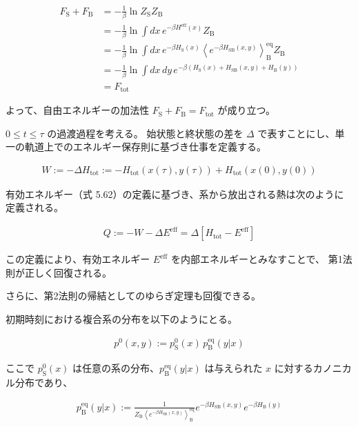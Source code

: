 \documentclass[a4paper,11pt]{jsarticle}
\numberwithin{equation}{section}
\begin{document}
\begin{align}
F_{\text{S}} + F_{\text{B}} &= -\frac{1}{\beta} \ln Z_{\text{S}} Z_{\text{B}} \\
&= -\frac{1}{\beta} \ln \int dx\, e^{-\beta H^{\mathrm{eff}}(x)} Z_{\text{B}} \\
&= -\frac{1}{\beta} \ln \int dx\, e^{-\beta H_{\text{S}}(x)} \left\langle e^{-\beta H_{\text{SB}}(x,y)} \right\rangle_{\text{B}}^{\mathrm{eq}} Z_{\text{B}} \\
&= -\frac{1}{\beta} \ln \int dx\, dy\, e^{-\beta (H_{\text{S}}(x) + H_{\text{SB}}(x,y) + H_{\text{B}}(y))} \\
&= F_{\text{tot}}
\end{align}

よって、自由エネルギーの加法性 $F_{\text{S}} + F_{\text{B}} = F_{\text{tot}}$ が成り立つ。

$0 \leq t \leq \tau$ の過渡過程を考える。  
始状態と終状態の差を $\Delta$ で表すことにし、単一の軌道上でのエネルギー保存則に基づき仕事を定義する。

\begin{align}
W := -\Delta H_{\text{tot}} := -H_{\text{tot}}(x(\tau), y(\tau)) + H_{\text{tot}}(x(0), y(0))
\end{align}

有効エネルギー（式 5.62）の定義に基づき、系から放出される熱は次のように定義される。

\begin{align}
Q := -W - \Delta E^{\mathrm{eff}} = \Delta [H_{\text{tot}} - E^{\mathrm{eff}}]
\end{align}

この定義により、有効エネルギー $E^{\mathrm{eff}}$ を内部エネルギーとみなすことで、
第1法則が正しく回復される。

さらに、第2法則の帰結としてのゆらぎ定理も回復できる。

初期時刻における複合系の分布を以下のようにとる。

\begin{align}
p^0(x, y) := p_{\text{S}}^0(x)\, p_{\text{B}}^{\mathrm{eq}}(y | x)
\end{align}

ここで $p_{\text{S}}^0(x)$ は任意の系の分布、$p_{\text{B}}^{\mathrm{eq}}(y | x)$ は与えられた $x$ に対するカノニカル分布であり、

\begin{align}
p_{\text{B}}^{\mathrm{eq}}(y | x) := \frac{1}{Z_{\text{B}} \left\langle e^{-\beta H_{\text{SB}}(x,y)} \right\rangle_{\text{B}}^{\mathrm{eq}}} e^{-\beta H_{\text{SB}}(x,y)} e^{-\beta H_{\text{B}}(y)}
\end{align}
\end{document}
